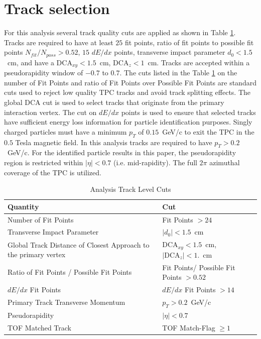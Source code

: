 \section{Track selection}\label{chap:trackCut}
For this analysis several track quality cuts are applied as shown in Table \ref{tab:trackCut}. Tracks are required to have at least $25$ fit points, ratio of fit points to possible fit points $N_{fit}/N_{poss}>0.52$, $15$ $dE/dx$ points, transverse impact parameter $d_0<1.5$~cm, and have a $\textrm{DCA}_{xy}<1.5$~cm, $\textrm{DCA}_{z}<1$~cm. Tracks are accepted within a pseudorapidity window of $-0.7$ to $0.7$.
The cuts listed in the Table \ref{tab:trackCut} on the number of Fit Points and ratio of Fit Points over Possible Fit Points are standard cuts used to reject low quality TPC tracks and avoid track splitting effects. The global
$\textrm{DCA}$ cut is used to select tracks that originate from the primary interaction vertex. The cut
on $dE/dx$ points is used to ensure that selected tracks have sufficient energy loss information
for particle identification purposes. Singly charged particles
must have a minimum $p_T$ of $0.15$~GeV/c to exit the TPC
in the $0.5$ Tesla magnetic field. In this analysis tracks
are required to have $p_T > 0.2$~GeV/c. For the identified
particle results in this paper, the pseudorapidity region is restricted
within $|\eta| < 0.7$ (i.e. mid-rapidity). The full $2\pi$ azimuthal coverage of the TPC is utilized.

	\begin{table}[H]
		\centering
		\begin{tabular}{| l | l |}
			\hline			
			Quantity & Cut \\
			\hline
			\hline
			Number of Fit Points & Fit Points $>24$\\
			Transverse Impact Parameter & $|d_0|<1.5$~cm\\ 
			Global Track Distance of Closest Approach to the primary vertex & $\textrm{DCA}_{xy}<1.5$~cm, $|\textrm{DCA}_{z}|<1.$~cm\\
			Ratio of Fit Points / Possible Fit Points & Fit Points/ Possible Fit Points $>0.52$\\
			$dE/dx$ Fit Points & $dE/dx$ Fit Points $>14$\\
			Primary Track Transverse Momentum & $p_{T}>0.2$~GeV/c\\
			Pseudorapidity & $|\eta|<0.7$\\
			TOF Matched Track & TOF Match-Flag $\geq1$\\
			\hline  
		\end{tabular}
		\caption[Analysis Track Level Cuts]{Analysis Track Level Cuts}
		\label{tab:trackCut}
	\end{table}
	
